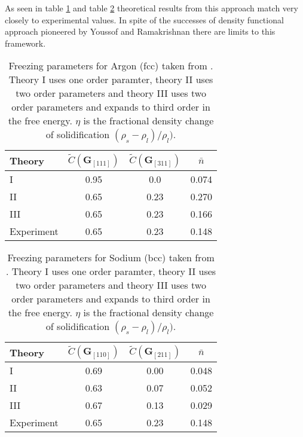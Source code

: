 As seen in table \ref{table:ramakrishnan_argon} and table
\ref{table:ramakrishnan_sodium} theoretical results from this approach match
very closely to experimental values. In spite of the successes of density
functional approach pioneered by Youssof and Ramakrishnan there are limits
to this framework.

\begin{table}[]
    \center
    \begin{tabular}{l c c c}
        \hline 
        Theory & $\tilde{C}(\mathbf{G}_{[111]})$ & $\tilde{C}(\mathbf{G}_{[311]})$ & $\bar{n}$ \\ 
        \hline
        I & 0.95 & 0.0 & 0.074 \\
        II & 0.65 & 0.23 & 0.270 \\
        III & 0.65 & 0.23 & 0.166 \\
        Experiment & 0.65 & 0.23 & 0.148\\
        \hline
    \end{tabular}
    \caption[Freezing parameters for Argon]{Freezing parameters for Argon (fcc)
    taken from \cite{RAMAKRISHNAN79}.  Theory I uses one order paramter, theory
    II uses two order parameters and theory III uses two order parameters and
    expands to third order in the free energy. $\eta$ is the fractional density
    change of solidification 
    $(\rho_s - \rho_l) / \rho_l)$.}
    \label{table:ramakrishnan_argon}
\end{table}

\begin{table}[]
    \center
    \begin{tabular}{l c c c}
        \hline 
        Theory & $\tilde{C}(\mathbf{G}_{[110]})$ & $\tilde{C}(\mathbf{G}_{[211]})$ & $\bar{n}$ \\ 
        \hline
        I           & 0.69 & 0.00 & 0.048 \\
        II          & 0.63 & 0.07 & 0.052 \\
        III         & 0.67 & 0.13 & 0.029 \\
        Experiment  & 0.65 & 0.23 & 0.148\\
        \hline
    \end{tabular}
    \caption[Freezing parameters for Sodium]{Freezing parameters for Sodium
    (bcc) taken from \cite{RAMAKRISHNAN79}.  Theory I uses one order paramter,
    theory II uses two order parameters and theory III uses two order
    parameters and expands to third order in the free energy. $\eta$ is the
    fractional density change of solidification 
    $(\rho_s - \rho_l) / \rho_l)$.}
    \label{table:ramakrishnan_sodium}
\end{table}

